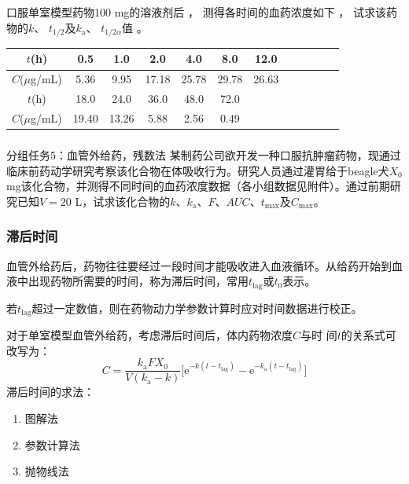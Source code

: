 \documentclass[dvipsnames, svgnames, x11names]{beamer}
\begin{document}
\begin{frame}[t]
    \frametitle{}
    \begin{example}
        口服单室模型药物100 mg的溶液剂后 ， 测得各时间的血药浓度如下 ， 试求该药物的$k$、 $t_{1/2}$及$k_\mathrm{a}$、 $t_{1/2\alpha}$值 。
        \begin{table}
            \centering
            \begin{tabular}{cccccccccccc}
                \bottomrule
                $t$(h) & 0.5 & 1.0 & 2.0 & 4.0 & 8.0 & 12.0 \\ \hline
                $C$($\mu$g/mL) & 5.36 & 9.95 & 17.18 & 25.78 & 29.78 & 26.63 \\ \bottomrule \bottomrule
                $t$(h) & 18.0 & 24.0 & 36.0 & 48.0 & 72.0 \\ \hline
                $C$($\mu$g/mL) & 19.40 & 13.26 & 5.88 & 2.56 & 0.49 \\ \toprule 
            \end{tabular}
        \end{table}
    \end{example}
\end{frame}


\begin{frame}[t]
    \frametitle{}
    \begin{redblock}{分组任务5：血管外给药，残数法}
        某制药公司欲开发一种口服抗肿瘤药物，现通过临床前药动学研究考察该化合物在体吸收行为。研究人员通过灌胃给于beagle犬$X_0$ mg该化合物，并测得不同时间的血药浓度数据（各小组数据见附件）。通过前期研究已知$V=20$ L，试求该化合物的$k$、$k_\mathrm{a}$、$F$、$AUC$、$t_\mathrm{max}$及$C_\mathrm{max}$。
    \end{redblock}
\end{frame}

\begin{frame}
    \frametitle{滞后时间}
    血管外给药后，药物往往要经过一段时间才能吸收进入血液循环。从给药开始到血液中出现药物所需要的时间，称为滞后时间，常用$t_\mathrm{lag}$或$t_0$表示。

    若$t_\mathrm{lag}$超过一定数值，则在药物动力学参数计算时应对时间数据进行校正。

    对于单室模型血管外给药，考虑滞后时间后，体内药物浓度$C$与时
    间$t$的关系式可改写为：
    \[
        C=\frac{k_\mathrm{a}FX_0}{V(k_\mathrm{a}-k)}\Big[\mathrm{e}^{-k(t-t_{\mathrm{lag}})}-\mathrm{e}^{-k_\mathrm{a}(t-t_\mathrm{lag})}\Big]
    \]
    滞后时间的求法：
    \begin{enumerate}
      \item 图解法
      \item 参数计算法
      \item 抛物线法
    \end{enumerate}
\end{frame}
\end{document}
